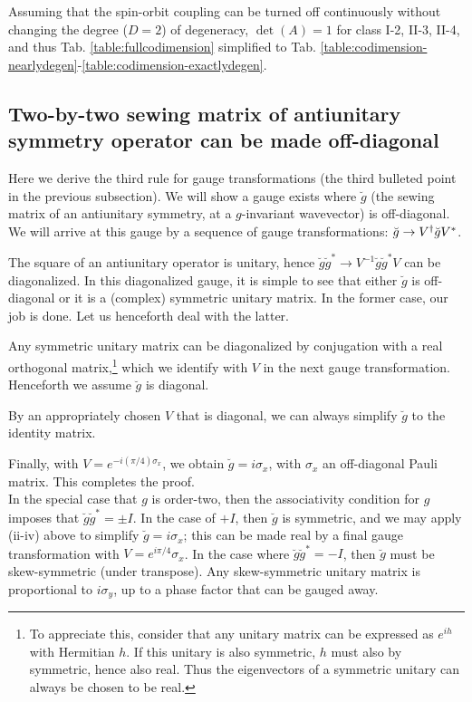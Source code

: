 \documentclass[aps, showpacs, twocolumn, notitlepage, superscriptaddress]{revtex4-1}
\begin{document}
Assuming that the spin-orbit coupling can be turned off continuously without changing the degree ($D=2$) of degeneracy, $\det(A)=1$ for class I-2, II-3, II-4, and thus Tab. \ref{table:fullcodimension} simplified to Tab. \ref{table:codimension-nearlydegen}-\ref{table:codimension-exactlydegen}.

\subsection{Two-by-two sewing matrix of antiunitary symmetry operator can be made off-diagonal\label{app:makinggoffdiagonal}}

Here we derive the third rule for gauge transformations (the third bulleted point in the previous subsection). We will show a gauge exists where $\breve{g}$ (the sewing matrix of an antiunitary symmetry, at a $g$-invariant wavevector) is off-diagonal. We will arrive at this gauge by a sequence of gauge transformations: $\breve{g}\rightarrow V^{\scriptstyle{\dagger}}\breve{g}V^*$.

 The square of an antiunitary operator is unitary, hence $\breve{g}\breve{g}^* \rightarrow V^{-1}\breve{g}\breve{g}^*V$ can be diagonalized. In this diagonalized gauge, it is simple to see that either $\breve{g}$ is off-diagonal or it is a (complex) symmetric unitary matrix. In the former case, our job is done. Let us henceforth deal with the latter.

 Any symmetric unitary matrix can be diagonalized by conjugation with a real orthogonal matrix,\footnote{To appreciate this, consider that any unitary matrix can be expressed as $e^{ih}$ with Hermitian $h$. If this unitary is also symmetric, $h$ must also by symmetric, hence also real. Thus the eigenvectors of a symmetric unitary can always be chosen to be real.} which we identify with $V$ in the next gauge transformation. Henceforth we assume $\breve{g}$ is diagonal. 

 By an appropriately chosen $V$ that is diagonal, we can always simplify $\breve{g}$ to the identity matrix.

 Finally, with $V=e^{-i(\pi/4)\sigma_x}$, we obtain $\breve{g}=i\sigma_x$, with $\sigma_x$ an off-diagonal Pauli matrix. This completes the proof.\\

In the special case that $g$ is order-two, then the associativity condition for $g$ imposes that $\breve{g}\breve{g}^*=\pm I$. In the case of $+I$, then $\breve{g}$ is symmetric, and we may apply (ii-iv) above to simplify $\breve{g}=i\sigma_x$; this can be made real by a final gauge transformation with $V=e^{i\pi/4}\sigma_x$. In the case where $\breve{g}\breve{g}^*=-I$, then $\breve{g}$ must be skew-symmetric (under transpose). Any skew-symmetric unitary matrix is proportional to $i\sigma_y$, up to a phase factor that can be gauged away.
\end{document}
